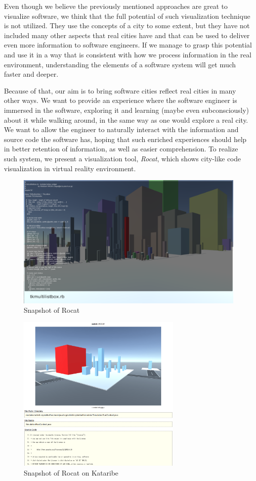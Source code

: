 \documentclass[conference]{IEEEtran}
\begin{document}
Even though we believe the previously mentioned approaches are great to visualize software, we think that the full potential of such visualization technique is not utilized.
They use the concepts of a city to some extent, but they have not included many other aspects that real cities have and that can be used to deliver even more information to software engineers.
If we manage to grasp this potential and use it in a way that is consistent with how we process information in the real environment, understanding the elements of a software system will get much faster and deeper.

Because of that, our aim is to bring software cities reflect real cities in many other ways.
We want to provide an experience where the software engineer is immersed in the software, exploring it and learning (maybe even subconsciously) about it while walking around, in the same way as one would explore a real city.
We want to allow the engineer to naturally interact with the information and source code the software has, hoping that such enriched experiences should help in better retention of information, as well as easier comprehension.
To realize such system, we present a visualization tool, \textit{Rocat}, which shows city-like code visualization in virtual reality environment.

\begin{figure}[t!]
\centering
\includegraphics[bb=0 0 1598 937, width=18cm]{rocat.png}
\caption{Snapshot of Rocat}
\label{figure:Rocat}
\end{figure}

\begin{figure}[tb]
\centering
\includegraphics[width=8cm]{Rocat-on-kataribe2.pdf}
\caption{Snapshot of Rocat on Kataribe}
\label{figure:Rocat-on-kataribe}
\end{figure}
\end{document}
